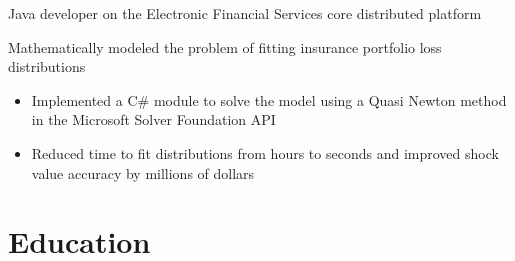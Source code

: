 \documentclass[10pt,a4paper,sans]{moderncv}        %
\begin{document}
{Java developer on the Electronic Financial Services core distributed platform}


{Mathematically modeled the problem of fitting insurance portfolio loss distributions
\begin{itemize}
	\item Implemented a C\# module to solve the model using a Quasi Newton method in the Microsoft Solver Foundation API
	\item Reduced time to fit distributions from hours to seconds and improved shock value accuracy by millions of dollars
\end{itemize}}




\section{Education}
\end{document}
